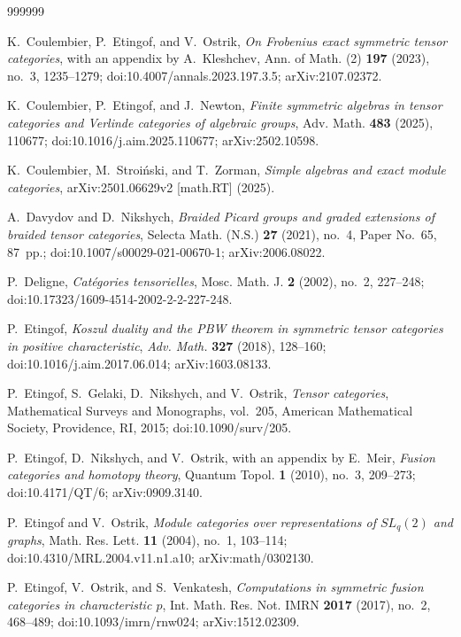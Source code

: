 \documentclass[12pt]{amsart}
\numberwithin{equation}{section}
\theoremstyle{plain}
\theoremstyle{definition}
\theoremstyle{remark}
\begin{document}
\begin{thebibliography}{999999}

 K.~Coulembier, P.~Etingof, and V.~Ostrik, \emph{On Frobenius exact symmetric tensor categories}, with an appendix by A.~Kleshchev, Ann. of Math. (2) \textbf{197} (2023), no.~3, 1235--1279; doi:10.4007/annals.2023.197.3.5; arXiv:2107.02372.

 K.~Coulembier, P.~Etingof, and J.~Newton, \emph{Finite symmetric algebras in tensor categories and Verlinde categories of algebraic groups}, Adv. Math. \textbf{483} (2025), 110677; doi:10.1016/j.aim.2025.110677; arXiv:2502.10598.

  K.~Coulembier, M.~Stroi\'{n}ski, and T.~Zorman, \emph{Simple algebras and exact module categories}, arXiv:2501.06629v2 [math.RT] (2025).

 A.~Davydov and D.~Nikshych, \emph{Braided Picard groups and graded extensions of braided tensor categories}, Selecta Math. (N.S.) \textbf{27} (2021), no.~4, Paper No.~65, 87~pp.; doi:10.1007/s00029-021-00670-1; arXiv:2006.08022.

 P.~Deligne, \emph{Cat\'egories tensorielles}, Mosc. Math. J. \textbf{2} (2002), no.~2, 227--248; doi:10.17323/1609-4514-2002-2-2-227-248.

 P.~Etingof, \emph{Koszul duality and the PBW theorem in symmetric tensor categories in positive characteristic}, 
\emph{Adv. Math.} \textbf{327} (2018), 128--160; doi:10.1016/j.aim.2017.06.014; arXiv:1603.08133.

 P.~Etingof, S.~Gelaki, D.~Nikshych, and V.~Ostrik, \emph{Tensor categories}, Mathematical Surveys and Monographs, vol.~205, American Mathematical Society, Providence, RI, 2015; doi:10.1090/surv/205.

 P.~Etingof, D.~Nikshych, and V.~Ostrik, with an appendix by E.~Meir, \emph{Fusion categories and homotopy theory}, Quantum Topol. \textbf{1} (2010), no.~3, 209--273; doi:10.4171/QT/6; arXiv:0909.3140.

 P.~Etingof and V.~Ostrik, \emph{Module categories over representations of $SL_q(2)$ and graphs}, Math. Res. Lett. \textbf{11} (2004), no.~1, 103--114; doi:10.4310/MRL.2004.v11.n1.a10; arXiv:math/0302130.

 P.~Etingof, V.~Ostrik, and S.~Venkatesh, \emph{Computations in symmetric fusion categories in characteristic $p$}, Int. Math. Res. Not. IMRN \textbf{2017} (2017), no.~2, 468--489; doi:10.1093/imrn/rnw024; arXiv:1512.02309.


\end{thebibliography}
\end{document}
